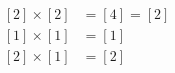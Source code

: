\documentclass[preview]{standalone}
\begin{document}
\begin{align*}
\begin{aligned}\left[2\right] \times \left[2\right] &= \left[4\right] = \left[2\right] \\\left[1\right] \times \left[1\right] &= \left[1\right] \\\left[2\right] \times \left[1\right] &= \left[2\right]\end{aligned}
\end{align*}
\end{document}
